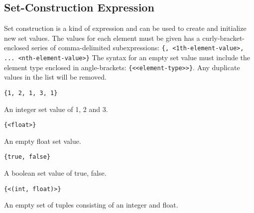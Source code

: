 
\subsection{Set-Construction Expression}
{
	Set construction is a kind of expression and can be
	used to create and initialize new set values.
	The values for each element must be given has a curly-bracket-enclosed
	series of comma-delimited
	subexpressions: \texttt{\{<0th-element-value>, <1th-element-value>, ... <nth-element-value>\}}
	The syntax for an empty set value must include the element type enclosed
	in angle-brackets: \texttt{\{<<element-type>>\}}.
	Any duplicate values in the list will be removed.
	
	\begin{itemize}
	{
		\item[] \lstinline[language=MAIA, columns=fixed]@{1, 2, 1, 3, 1}@
		
			An integer set value of 1, 2 and 3.
		
		\item[] \lstinline[language=MAIA, columns=fixed]@{<float>}@
		
			An empty float set value.
		
		\item[] \lstinline[language=MAIA, columns=fixed]@{true, false}@
		
			A boolean set value of true, false.
		
		\item[] \lstinline[language=MAIA, columns=fixed]@{<(int, float)>}@
		
			An empty set of tuples consisting
				of an integer and float.
	}
	\end{itemize}
}

